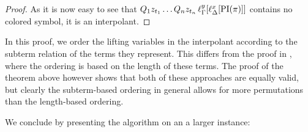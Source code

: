 \begin{proof}
	As it is now easy to see that $Q_1 z_{t_1} \dots Q_n z_{t_n}\,\ell_{\Gamma}^{y}[\ell_{\Delta}^{x}[\operatorname{PI}(\pi)]]$ contains no colored symbol, it is an interpolant.
\end{proof}


\begin{remark}
	In this proof, we order the lifting variables in the interpolant according to the subterm relation of the terms they represent.
	This differs from the proof in \cite{Huang95}, where the ordering is based on the length of these terms.
	The proof of the theorem above however shows that both of these approaches are equally valid, but clearly the subterm-based ordering in general allows for more permutations than the length-based ordering. 
\end{remark}

We conclude by presenting the algorithm on an a larger instance:

